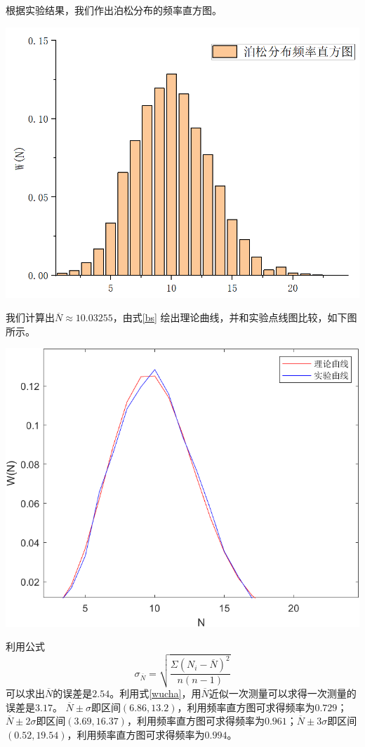 \documentclass[hyperref]{ctexart}
\begin{document}
\begin{multicols}{2}
根据实验结果，我们作出泊松分布的频率直方图。

\begin{center}\includegraphics[scale=0.2]{bsfb.png} \end{center}

我们计算出$\overline{N}\approx 10.03255$，由式\eqref{bs} 绘出理论曲线，并和实验点线图比较，如下图所示。

\begin{center}\includegraphics[scale=0.5]{bsqx.png} \end{center}

利用公式\begin{equation}\sigma_{\overline{N}}=\sqrt {\frac {\Sigma (N_i-\overline{N})^2}{n(n-1)}}\label{jfc}\end{equation}可以求出$\overline{N}$的误差是$2.54$。利用式\eqref{wucha}，用$\overline{N}$近似一次测量可以求得一次测量的误差是$3.17$。
$\overline{N}\pm \sigma$即区间$(6.86,13.2)$，利用频率直方图可求得频率为$0.729$；$\overline{N}\pm 2\sigma$即区间$(3.69,16.37)$，利用频率直方图可求得频率为$0.961$；$\overline{N}\pm 3\sigma$即区间$(0.52,19.54)$，利用频率直方图可求得频率为$0.994$。


\end{multicols}
\end{document}
